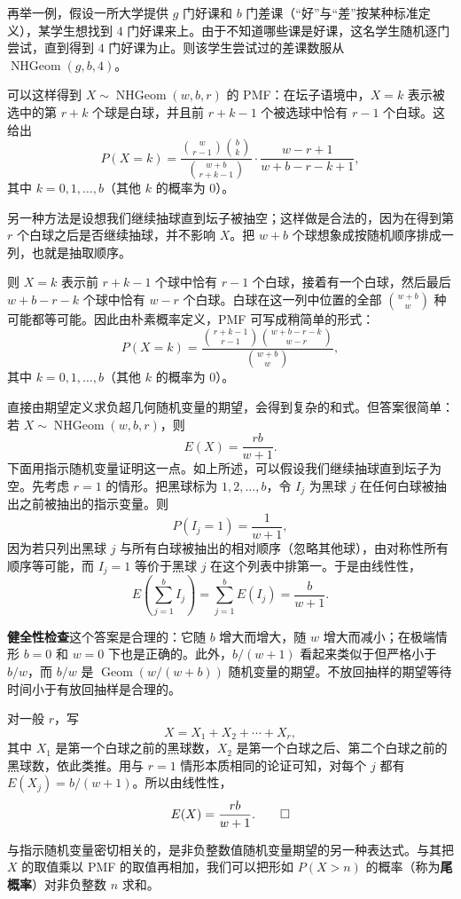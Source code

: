 \documentclass[UTF8, 12pt, fontset=fandol, oneside]{ctexart}
\begin{document}
再举一例，假设一所大学提供 $g$ 门好课和 $b$ 门差课（“好”与“差”按某种标准定义），某学生想找到 $4$ 门好课来上。由于不知道哪些课是好课，这名学生随机逐门尝试，直到得到 $4$ 门好课为止。则该学生尝试过的差课数服从 $\operatorname{NHGeom}(g,b,4)$。

可以这样得到 $X\sim\operatorname{NHGeom}(w,b,r)$ 的 PMF：在坛子语境中，$X=k$ 表示被选中的第 $r+k$ 个球是白球，并且前 $r+k-1$ 个被选球中恰有 $r-1$ 个白球。这给出
\[
  P(X=k)=
  \frac{\binom{w}{r-1}\binom{b}{k}}{\binom{w+b}{r+k-1}}
  \cdot
  \frac{w-r+1}{w+b-r-k+1},
\]
其中 $k=0,1,\ldots,b$（其他 $k$ 的概率为 $0$）。

另一种方法是设想我们继续抽球直到坛子被抽空；这样做是合法的，因为在得到第 $r$ 个白球之后是否继续抽球，并不影响 $X$。把 $w+b$ 个球想象成按随机顺序排成一列，也就是抽取顺序。

则 $X=k$ 表示前 $r+k-1$ 个球中恰有 $r-1$ 个白球，接着有一个白球，然后最后 $w+b-r-k$ 个球中恰有 $w-r$ 个白球。白球在这一列中位置的全部 $\binom{w+b}{w}$ 种可能都等可能。因此由朴素概率定义，PMF 可写成稍简单的形式：
\[
  P(X=k)=
  \frac{\binom{r+k-1}{r-1}\binom{w+b-r-k}{w-r}}{\binom{w+b}{w}},
\]
其中 $k=0,1,\ldots,b$（其他 $k$ 的概率为 $0$）。

直接由期望定义求负超几何随机变量的期望，会得到复杂的和式。但答案很简单：若 $X\sim\operatorname{NHGeom}(w,b,r)$，则
\[
  E(X)=\frac{rb}{w+1}.
\]
下面用指示随机变量证明这一点。如上所述，可以假设我们继续抽球直到坛子为空。先考虑 $r=1$ 的情形。把黑球标为 $1,2,\ldots,b$，令 $I_j$ 为黑球 $j$ 在任何白球被抽出之前被抽出的指示变量。则
\[
  P(I_j=1)=\frac{1}{w+1},
\]
因为若只列出黑球 $j$ 与所有白球被抽出的相对顺序（忽略其他球），由对称性所有顺序等可能，而 $I_j=1$ 等价于黑球 $j$ 在这个列表中排第一。于是由线性性，
\[
  E\left(\sum_{j=1}^b I_j\right)
  =\sum_{j=1}^b E(I_j)
  =\frac{b}{w+1}.
\]

\noindent\textbf{健全性检查}\quad 这个答案是合理的：它随 $b$ 增大而增大，随 $w$ 增大而减小；在极端情形 $b=0$ 和 $w=0$ 下也是正确的。此外，$b/(w+1)$ 看起来类似于但严格小于 $b/w$，而 $b/w$ 是 $\operatorname{Geom}(w/(w+b))$ 随机变量的期望。不放回抽样的期望等待时间小于有放回抽样是合理的。

对一般 $r$，写
\[
  X=X_1+X_2+\cdots+X_r,
\]
其中 $X_1$ 是第一个白球之前的黑球数，$X_2$ 是第一个白球之后、第二个白球之前的黑球数，依此类推。用与 $r=1$ 情形本质相同的论证可知，对每个 $j$ 都有 $E(X_j)=b/(w+1)$。所以由线性性，
\[
  E(X)=\frac{rb}{w+1}. \qed
\]

与指示随机变量密切相关的，是非负整数值随机变量期望的另一种表达式。与其把 $X$ 的取值乘以 PMF 的取值再相加，我们可以把形如 $P(X>n)$ 的概率（称为\textbf{尾概率}）对非负整数 $n$ 求和。
\end{document}
